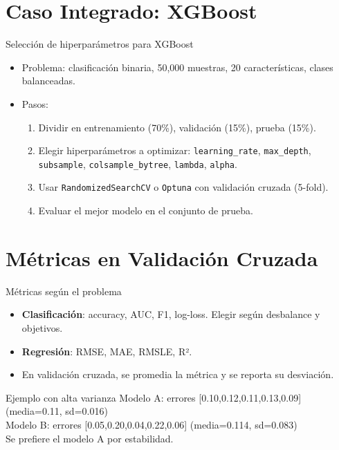 \documentclass[aspectratio=169, 10pt, xcolor=table]{beamer}
\begin{document}
\section{Caso Integrado: XGBoost}

\begin{frame}{Selección de hiperparámetros para XGBoost}
    \begin{itemize}
        \item Problema: clasificación binaria, 50,000 muestras, 20 características, clases balanceadas.
        \item Pasos:
        \begin{enumerate}
            \item Dividir en entrenamiento (70\%), validación (15\%), prueba (15\%).
            \item Elegir hiperparámetros a optimizar: \texttt{learning\_rate}, \texttt{max\_depth}, \texttt{subsample}, \texttt{colsample\_bytree}, \texttt{lambda}, \texttt{alpha}.
            \item Usar \texttt{RandomizedSearchCV} o \texttt{Optuna} con validación cruzada (5-fold).
            \item Evaluar el mejor modelo en el conjunto de prueba.
        \end{enumerate}
    \end{itemize}
\end{frame}

\section{Métricas en Validación Cruzada}

\begin{frame}{Métricas según el problema}
    \begin{itemize}
        \item \textbf{Clasificación}: accuracy, AUC, F1, log-loss. Elegir según desbalance y objetivos.
        \item \textbf{Regresión}: RMSE, MAE, RMSLE, R².
        \item En validación cruzada, se promedia la métrica y se reporta su desviación.
    \end{itemize}
    \begin{exampleblock}{Ejemplo con alta varianza}
        Modelo A: errores [0.10,0.12,0.11,0.13,0.09] (media=0.11, sd=0.016) \\
        Modelo B: errores [0.05,0.20,0.04,0.22,0.06] (media=0.114, sd=0.083) \\
        Se prefiere el modelo A por estabilidad.
    \end{exampleblock}
\end{frame}
\end{document}
